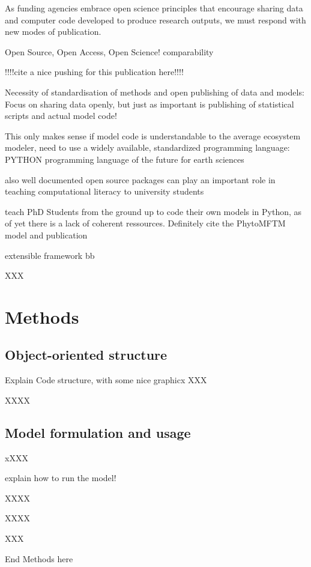 As funding agencies embrace open science principles that encourage sharing data and computer code developed to produce research outputs, we must respond with new modes of publication.

Open Source, Open Access, Open Science!
comparability

!!!!cite a nice pushing for this publication here!!!!

Necessity of standardisation of methods and open publishing of data and models: \citep{Reichman2011}
Focus on sharing data openly, but just as important is publishing of statistical scripts and actual model code!

This only makes sense if model code is understandable to the average ecosystem modeler, need to use a widely available, standardized programming language:
PYTHON
programming language of the future for earth sciences \citep{Lin2012}

also well documented open source packages can play an important role in teaching computational literacy to university students \citep{Farrell2018}



teach PhD Students from the ground up to code their own models in Python, as of yet there is a lack of coherent ressources. Definitely cite the PhytoMFTM model and publication \citep{AcevedoTrejos2016}

extensible framework
bb



XXX

\section{Methods}



\subsection{Object-oriented structure}
Explain Code structure, with some nice graphicx
XXX

XXXX

\subsection{Model formulation and usage}
xXXX

explain how to run the model!

XXXX

XXXX

XXX


End Methods here

